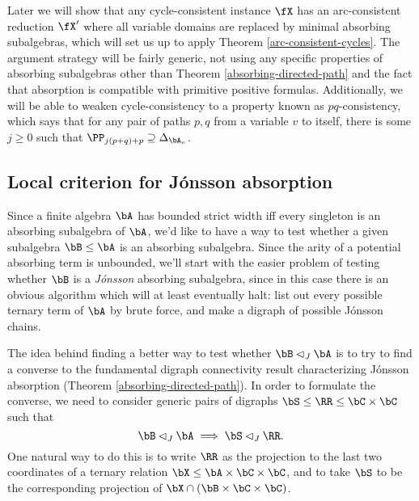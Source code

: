 Later we will show that any cycle-consistent instance $\fX$ has an arc-consistent reduction $\fX'$ where all variable domains are replaced by minimal absorbing subalgebras, which will set us up to apply Theorem \ref{arc-consistent-cycles}. The argument strategy will be fairly generic, not using any specific properties of absorbing subalgebras other than Theorem \ref{absorbing-directed-path} and the fact that absorption is compatible with primitive positive formulas. Additionally, we will be able to weaken cycle-consistency to a property known as $pq$-consistency, which says that for any pair of paths $p,q$ from a variable $v$ to itself, there is some $j \ge 0$ such that $\PP_{j(p+q)+p} \supseteq \Delta_{\bA_v}$.


\subsection{Local criterion for J\'onsson absorption}

Since a finite algebra $\bA$ has bounded strict width iff every singleton is an absorbing subalgebra of $\bA$, we'd like to have a way to test whether a given subalgebra $\bB \le \bA$ is an absorbing subalgebra. Since the arity of a potential absorbing term is unbounded, we'll start with the easier problem of testing whether $\bB$ is a \emph{J\'onsson} absorbing subalgebra, since in this case there is an obvious algorithm which will at least eventually halt: list out every possible ternary term of $\bA$ by brute force, and make a digraph of possible J\'onsson chains.

The idea behind finding a better way to test whether $\bB \lhd_J \bA$ is to try to find a converse to the fundamental digraph connectivity result characterizing J\'onsson absorption (Theorem \ref{absorbing-directed-path}). In order to formulate the converse, we need to consider generic pairs of digraphs $\bS \le \RR \le \bC\times \bC$ such that
\[
\bB \lhd_J \bA \implies \bS \lhd_J \RR.
\]
One natural way to do this is to write $\RR$ as the projection to the last two coordinates of a ternary relation $\bX \le \bA\times\bC\times\bC$, and to take $\bS$ to be the corresponding projection of $\bX \cap (\bB\times\bC\times\bC)$.

